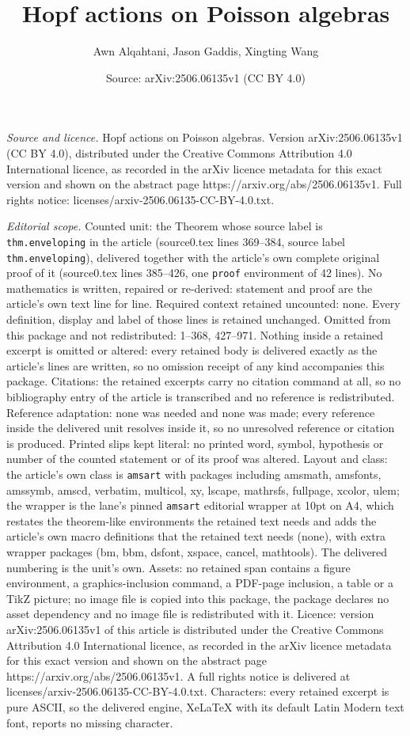 \documentclass[10pt,a4paper]{amsart}
\title[Hopf actions on Poisson algebras]{Hopf actions on Poisson algebras}
\author{Awn Alqahtani, Jason Gaddis, Xingting Wang}
\date{Source: arXiv:2506.06135v1 (CC BY 4.0)}
\begin{document}
\maketitle

\noindent\emph{Source and licence.} Hopf actions on Poisson algebras. Version arXiv:2506.06135v1 (CC BY 4.0), distributed under the Creative Commons Attribution 4.0 International licence, as recorded in the arXiv licence metadata for this exact version and shown on the abstract page https://arxiv.org/abs/2506.06135v1. Full rights notice: licenses/arxiv-2506.06135-CC-BY-4.0.txt.\par\smallskip

\noindent\textit{Editorial scope.} Counted unit: the Theorem whose source label is \texttt{thm.enveloping} in the article (source0.tex lines 369--384, source label \texttt{thm.enveloping}), delivered together with the article's own complete original proof of it (source0.tex lines 385--426, one \texttt{proof} environment of 42 lines). No mathematics is written, repaired or re-derived: statement and proof are the article's own text line for line. Required context retained uncounted: none. Every definition, display and label of those lines is retained unchanged. Omitted from this package and not redistributed: 1--368, 427--971. Nothing inside a retained excerpt is omitted or altered: every retained body is delivered exactly as the article's lines are written, so no omission receipt of any kind accompanies this package. Citations: the retained excerpts carry no citation command at all, so no bibliography entry of the article is transcribed and no reference is redistributed. Reference adaptation: none was needed and none was made; every reference inside the delivered unit resolves inside it, so no unresolved reference or citation is produced. Printed slips kept literal: no printed word, symbol, hypothesis or number of the counted statement or of its proof was altered. Layout and class: the article's own class is \texttt{amsart} with packages including amsmath, amsfonts, amssymb, amscd, verbatim, multicol, xy, lscape, mathrsfs, fullpage, xcolor, ulem; the wrapper is the lane's pinned \texttt{amsart} editorial wrapper at 10pt on A4, which restates the theorem-like environments the retained text needs and adds the article's own macro definitions that the retained text needs (none), with extra wrapper packages (bm, bbm, dsfont, xspace, cancel, mathtools). The delivered numbering is the unit's own. Assets: no retained span contains a figure environment, a graphics-inclusion command, a PDF-page inclusion, a table or a TikZ picture; no image file is copied into this package, the package declares no asset dependency and no image file is redistributed with it. Licence: version arXiv:2506.06135v1 of this article is distributed under the Creative Commons Attribution 4.0 International licence, as recorded in the arXiv licence metadata for this exact version and shown on the abstract page https://arxiv.org/abs/2506.06135v1. A full rights notice is delivered at licenses/arxiv-2506.06135-CC-BY-4.0.txt. Characters: every retained excerpt is pure ASCII, so the delivered engine, XeLaTeX with its default Latin Modern text font, reports no missing character.
\end{document}
